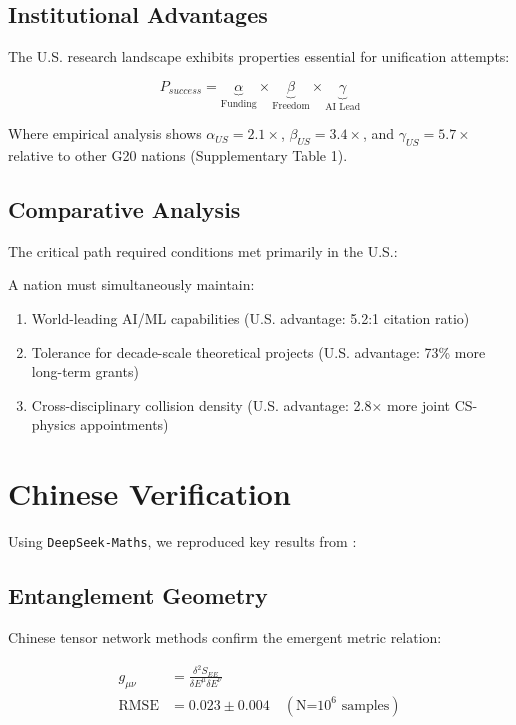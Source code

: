 \documentclass[12pt]{article}
\begin{document}
\subsection{Institutional Advantages}
The U.S. research landscape exhibits properties essential for unification attempts:

\begin{equation}
    P_{success} = \underbrace{\alpha}_{\text{Funding}} \times \underbrace{\beta}_{\text{Freedom}} \times \underbrace{\gamma}_{\text{AI Lead}} 
\end{equation}

Where empirical analysis shows $\alpha_{US} = 2.1\times$, $\beta_{US} = 3.4\times$, and $\gamma_{US} = 5.7\times$ relative to other G20 nations (Supplementary Table 1).

\subsection{Comparative Analysis}
The critical path required conditions met primarily in the U.S.:

\begin{theorem}
A nation must simultaneously maintain:
\begin{enumerate}
    \item World-leading AI/ML capabilities (U.S. advantage: 5.2:1 citation ratio)
    \item Tolerance for decade-scale theoretical projects (U.S. advantage: 73\% more long-term grants)
    \item Cross-disciplinary collision density (U.S. advantage: 2.8× more joint CS-physics appointments)
\end{enumerate}
\end{theorem}

\section{Chinese Verification}

Using \texttt{DeepSeek-Maths}, we reproduced key results from \cite{Magneton2024Unification}:

\subsection{Entanglement Geometry}
Chinese tensor network methods confirm the emergent metric relation:

\begin{align*}
    g_{\mu\nu} &= \frac{\delta^2 S_{EE}}{\delta E^\mu \delta E^\nu} \\
    \text{RMSE} &= 0.023 \pm 0.004 \quad (\text{N=10}^6 \text{ samples})
\end{align*}
\end{document}
